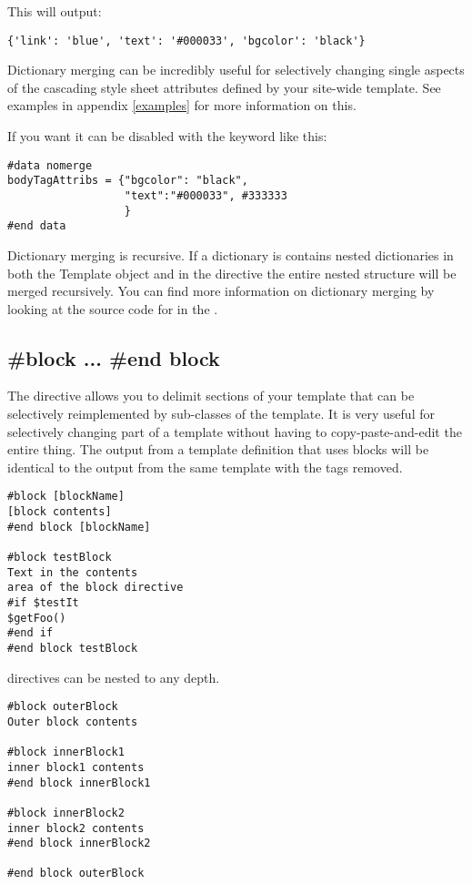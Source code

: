 This will output:
\begin{verbatim}
{'link': 'blue', 'text': '#000033', 'bgcolor': 'black'} 
\end{verbatim}

Dictionary merging can be incredibly useful for selectively changing single
aspects of the cascading style sheet attributes defined by your site-wide
template.  See examples in appendix \ref{examples} for more information on this.

If you want it can be disabled with the  keyword like this:
\begin{verbatim}
#data nomerge
bodyTagAttribs = {"bgcolor": "black",
                  "text":"#000033", #333333
                  }
#end data
\end{verbatim}

Dictionary merging is recursive.  If a dictionary is contains nested
dictionaries in both the Template object and in the  directive the
entire nested structure will be merged recursively.  You can find more
information on dictionary merging by looking at the source code for
 in the .


\subsection{\#block ... \#end block}
\label{directives.block}

The  directive allows you to delimit sections of your template
that can be selectively reimplemented by sub-classes of the template.  It is
very useful for selectively changing part of a template without having to
copy-paste-and-edit the entire thing.  The output from a template definition
that uses blocks will be identical to the output from the same template with the 
 tags removed. 

\begin{verbatim}
#block [blockName] 
[block contents] 
#end block [blockName]

#block testBlock
Text in the contents 
area of the block directive
#if $testIt
$getFoo() 
#end if
#end block testBlock
\end{verbatim}

 directives can be nested to any depth.

\begin{verbatim}
#block outerBlock
Outer block contents 

#block innerBlock1
inner block1 contents 
#end block innerBlock1

#block innerBlock2
inner block2 contents 
#end block innerBlock2

#end block outerBlock
\end{verbatim}

